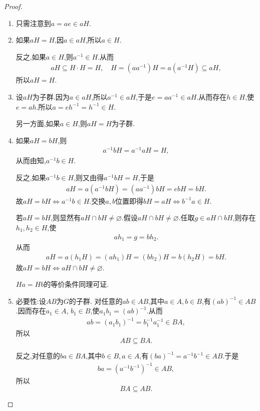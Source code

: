 \documentclass[../../main.tex]{subfiles}%
\begin{document}
\begin{proof}
\begin{enumerate}[(1)]
\item 只需注意到$a=ae\in aH$.

\item 如果$aH=H$,因$a\in aH$,所以$a\in H$.

反之,如果$a\in H$,则$a^{-1}\in H$.从而
\begin{align*}
aH\subseteq H\cdot H=H, \quad
H=(aa^{-1})H=a(a^{-1}H)\subseteq aH,
\end{align*}
所以$aH=H$.

\item 设$aH$为子群.因为$a\in aH$,所以$a^{-1}\in aH$,于是$e=aa^{-1}\in aH$.从而存在$h\in H$,使$e=ah$.所以$a=eh^{-1}=h^{-1}\in H$.

另一方面,如果$a\in H$,则$aH=H$为子群.

\item 如果$aH=bH$,则
\begin{align*}
a^{-1}bH=a^{-1}aH=H,
\end{align*}
从而由知,$a^{-1}b\in H$.

反之,如果$a^{-1}b\in H$,则又由得$a^{-1}bH=H$,于是
\begin{align*}
aH=a(a^{-1}bH)=(aa^{-1})bH=ebH=bH.
\end{align*}
故$aH=bH\iff a^{-1}b\in H$.交换$a,b$位置即得$bH=aH\iff b^{-1}a\in H$.

若$aH=bH$,则显然有$aH\cap bH\neq \varnothing$.假设$aH\cap bH\neq\varnothing$.任取$g\in aH\cap bH$,则存在$h_1,h_2\in H$,使
\begin{align*}
ah_1=g=bh_2.
\end{align*}
从而
\begin{align*}
aH=a(h_1H)=(ah_1)H=(bh_2)H=b(h_2H)=bH.
\end{align*}
故$aH=bH\iff aH\cap bH\neq \varnothing$.

$Ha=Hb$的等价条件同理可证.

\item {\heiti 必要性:}设$AB$为$G$的子群.
对任意的$ab\in AB$,其中$a\in A,b\in B$,有$(ab)^{-1}\in AB$.因而存在$a_1\in A$,
$b_1\in B$,使$a_1b_1=(ab)^{-1}$.从而
\begin{align*}
ab=(a_1b_1)^{-1}=b_1^{-1}a_1^{-1}\in BA,
\end{align*}
所以
$$AB\subseteq BA.$$

反之,对任意的$ba\in BA$,其中$b\in B,a\in A$,有$(ba)^{-1}=a^{-1}b^{-1}\in AB$.于是
\begin{align*}
ba=(a^{-1}b^{-1})^{-1}\in AB,
\end{align*}
所以
$$BA\subseteq AB.$$


\end{enumerate}
\end{proof}
\end{document}
